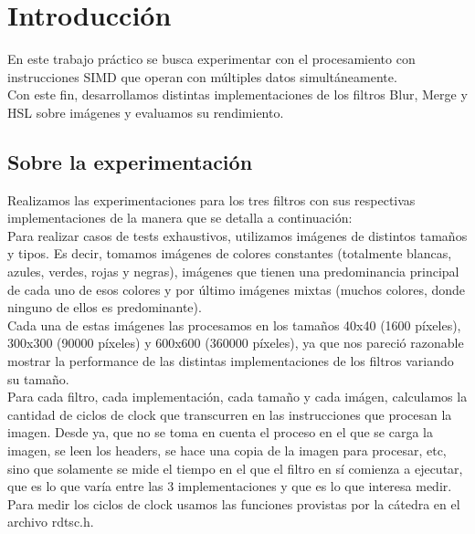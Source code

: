 \section{Introducción}
En este trabajo práctico se busca experimentar con el procesamiento con instrucciones SIMD que operan con múltiples datos simultáneamente.\\ 
Con este fin, desarrollamos distintas implementaciones de los filtros Blur, Merge y HSL sobre imágenes y evaluamos su rendimiento.\\
\subsection{Sobre la experimentación}
Realizamos las experimentaciones para los tres filtros con sus respectivas implementaciones de la manera que se detalla a continuación:\\
Para realizar casos de tests exhaustivos, utilizamos imágenes de distintos tamaños y tipos. Es decir, tomamos imágenes de colores constantes (totalmente blancas, azules, verdes, rojas y negras), imágenes que tienen una predominancia principal de cada uno de esos colores y por último imágenes mixtas (muchos colores, donde ninguno de ellos es predominante).\\
Cada una de estas imágenes las procesamos en los tamaños 40x40 (1600 píxeles), 300x300 (90000 píxeles) y 600x600 (360000 píxeles), ya que nos pareció razonable mostrar la performance de las distintas implementaciones de los filtros variando su tamaño.\\
Para cada filtro, cada implementación, cada tamaño y cada imágen, calculamos la cantidad de ciclos de clock que transcurren en las instrucciones que procesan la imagen. Desde ya, que no se toma en cuenta el proceso en el que se carga la imagen, se leen los headers, se hace una copia de la imagen para procesar, etc, sino que solamente se mide el tiempo en el que el filtro en sí comienza a ejecutar, que es lo que varía entre las 3 implementaciones y que es lo que interesa medir.\\
Para medir los ciclos de clock usamos las funciones provistas por la cátedra en el archivo rdtsc.h.\\ 

